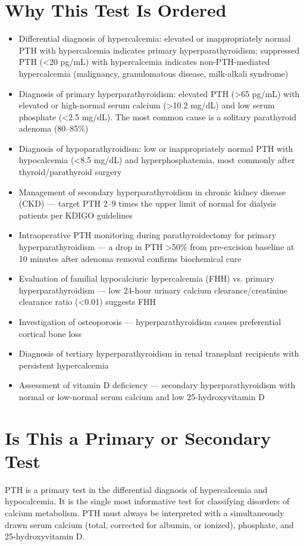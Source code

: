 \section*{Why This Test Is Ordered}
\begin{itemize}
  \item Differential diagnosis of hypercalcemia: elevated or inappropriately normal PTH with hypercalcemia indicates primary hyperparathyroidism; suppressed PTH (<20 pg/mL) with hypercalcemia indicates non-PTH-mediated hypercalcemia (malignancy, granulomatous disease, milk-alkali syndrome)
  \item Diagnosis of primary hyperparathyroidism: elevated PTH (>65 pg/mL) with elevated or high-normal serum calcium (>10.2 mg/dL) and low serum phosphate (<2.5 mg/dL). The most common cause is a solitary parathyroid adenoma (80--85\%)
  \item Diagnosis of hypoparathyroidism: low or inappropriately normal PTH with hypocalcemia (<8.5 mg/dL) and hyperphosphatemia, most commonly after thyroid/parathyroid surgery
  \item Management of secondary hyperparathyroidism in chronic kidney disease (CKD) --- target PTH 2--9 times the upper limit of normal for dialysis patients per KDIGO guidelines
  \item Intraoperative PTH monitoring during parathyroidectomy for primary hyperparathyroidism --- a drop in PTH >50\% from pre-excision baseline at 10 minutes after adenoma removal confirms biochemical cure
  \item Evaluation of familial hypocalciuric hypercalcemia (FHH) vs. primary hyperparathyroidism --- low 24-hour urinary calcium clearance/creatinine clearance ratio (<0.01) suggests FHH
  \item Investigation of osteoporosis --- hyperparathyroidism causes preferential cortical bone loss
  \item Diagnosis of tertiary hyperparathyroidism in renal transplant recipients with persistent hypercalcemia
  \item Assessment of vitamin D deficiency --- secondary hyperparathyroidism with normal or low-normal serum calcium and low 25-hydroxyvitamin D
\end{itemize}

\section*{Is This a Primary or Secondary Test}
PTH is a primary test in the differential diagnosis of hypercalcemia and hypocalcemia. It is the single most informative test for classifying disorders of calcium metabolism. PTH must always be interpreted with a simultaneously drawn serum calcium (total, corrected for albumin, or ionized), phosphate, and 25-hydroxyvitamin D.

